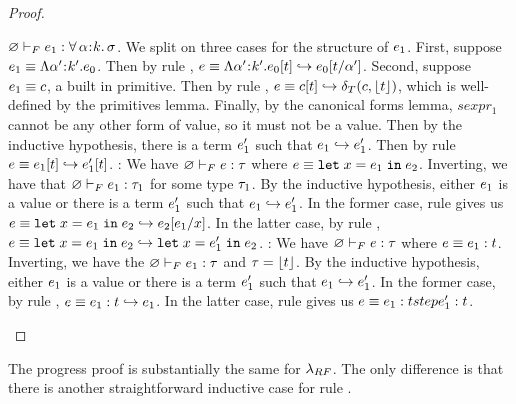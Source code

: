 \begin{proof}
\begin{itemize}
${\varnothing} \vdash_F {e_1} : {\forall\, \alpha\hspace{0.05em}{:}\hspace{0.05em} k.\, \sigma}$.
We split on three cases for the structure of $e_1$.
%
First, suppose $\sexpr_1 \equiv \tabs{\tvar'}{\skind'}{\sexpr_0}$.
Then by rule \eTAppAbs, 
$\sexpr \equiv \tyapp{\tabs{\tvar'}{\skind'}{\sexpr_0}}{\stype} 
\step \subst{\sexpr_0}{\tvar'}{\stype}$.
%
Second, suppose $e_1 \equiv c$, a built in primitive.
Then by rule \eTPrim, 
$e \equiv  c[t] \hookrightarrow \delta_T(c,\lfloor{\ensuremath{t}}\rfloor)$,
which is well-defined by the primitives lemma.
%
Finally, by the canonical forms lemma, $sexpr_1$ cannot be any other
form of value, so it must not be a value. Then by the inductive hypothesis,
there is a term $e'_1$ such that $e_1 \hookrightarrow e'_1$. 
Then by rule \eTApp
$e \equiv e_1[t] \hookrightarrow e'_1[t]$.
\pfcase{\fLet}: We have 
${\varnothing} \vdash_F {e} : {\tau}$ where
$e \equiv {{\texttt{let}}}\;x{{\;=\;}}e_1\;{{\texttt{in}}}\;e_2$. Inverting,
we have that ${\varnothing} \vdash_F {e_1} : {\tau_1}$
for some type $\tau_1$. 
By the inductive hypothesis, either $e_1$ is a value
or there is a term $e'_1$ such that $e_1 \hookrightarrow e'_1$.
In the former case, rule \eLetV gives us
$e \equiv \eletin{x}{\sexpr_1}{\sexpr_2} \step \subst{\sexpr_2}{x}{\sexpr_1}$.
In the latter case, by rule \eLet, 
$e \equiv {{\texttt{let}}}\;x{{\;=\;}}e_1\;{{\texttt{in}}}\;e_2 \hookrightarrow {{\texttt{let}}}\;x{{\;=\;}}e'_1\;{{\texttt{in}}}\;e_2$.
\pfcase{\fAnn}: We have 
${\varnothing} \vdash_F {e} : {\tau}$ where
$e \equiv e_1 : t$. Inverting,
we have the ${\varnothing} \vdash_F {e_1} : {\tau}$ and
$\tau = \lfloor{\ensuremath{t}}\rfloor$. 
By the inductive hypothesis, either $e_1$ is a value
or there is a term $e'_1$ such that $e_1 \hookrightarrow e'_1$.
In the former case, by rule \eAnnV, 
$e \equiv e_1 : t \hookrightarrow e_1$.
In the latter case, rule \eAnn gives us 
$e \equiv e_1 : t step e'_1 : t$.
\end{itemize}
\end{proof}
The progress proof is substantially the same for $\lambda_{RF}$. 
The only difference is that there is 
another straightforward inductive case for rule \tSub. 
